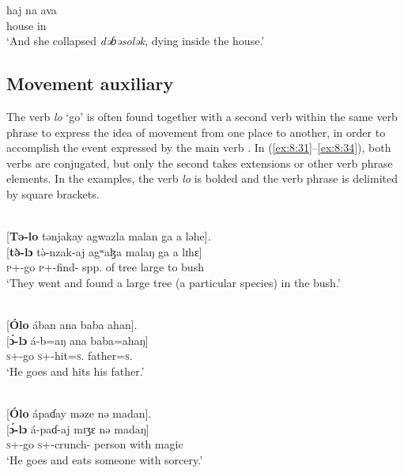 \medskip     
\gll haj  na ava\\
    house  {\PSP}   in\\ 
\glt  ‘And she collapsed \textit{dəɓəsolək}, dying inside the house.’\\
\z
{}
\subsection{Movement auxiliary}\label{sec:8.2.2}
\hypertarget{RefHeading1212581525720847}{}
The verb \textit{lo} ‘go’ is often found together with a second verb within the same verb phrase to express the idea of movement from one place to another, in order to accomplish the event expressed by the main verb \citep{FriesenMamalis2008}. In (\ref{ex:8:31}--\ref{ex:8:34}), both verbs are conjugated, but only the second takes extensions or other verb phrase elements. In the examples, the verb \textit{lo} is bolded and the verb phrase is delimited by square brackets. 

\ea \label{ex:8:31}\\
{}[\textbf{Tə-lo} tənjakay  agwazla  malan  ga  a  ləhe].\\
\gll  {}[\textbf{t\`{ə}-lɔ}          t\`{ə}-nzak-aj        agʷaɮa      malaŋ   ga      a    lɪhɛ]\\
      \textsc{p}+{\PFV}-go   \textsc{p}+{\PFV}-find{}-{\CL}   {spp. of tree}    large   {\ADJ}  to   bush\\
\glt  ‘They went and found a large tree (a particular species) in the bush.’
\z

\ea \label{ex:8:32}\\\relax
{}[\textbf{\'{O}lo}  ában  ana  baba  ahan].\\
\gll  {}[\textbf{\'{ɔ}-lɔ}   á-b=aŋ     ana   baba=ahaŋ]\\
      \textsc{s}+{\IFV}-go  \textsc{s}+{\IFV}-hit=\textsc{s}.{\IO}  {\DAT} father=\textsc{s}.{\POSS}\\
\glt  ‘He goes and hits his father.’
\z

\ea \label{ex:8:33}\\
{}[\textbf{\'{O}lo}  ápaɗay  məze  nə  madan].\\
\gll  {}[\textbf{\'{ɔ}-lɔ}   á-paɗ{}-aj     mɪʒɛ   nə   madaŋ]\\
      \textsc{s}+{\IFV}-go  \textsc{s}+{\IFV}-crunch{}-{\CL}  person  with  magic\\
\glt  ‘He goes and eats someone with sorcery.’
\z

